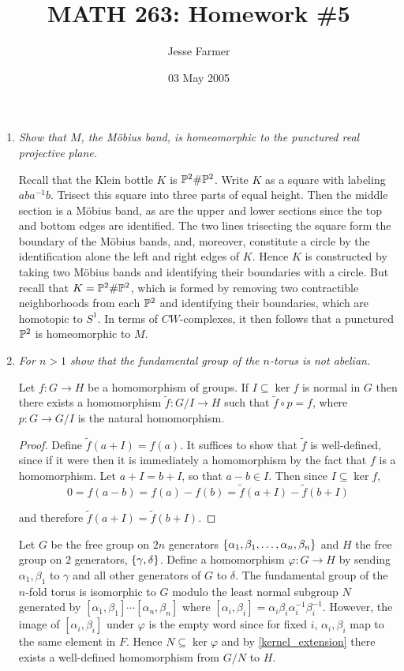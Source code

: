 \documentclass[10pt]{article}
\title{MATH 263: Homework \#5}
\author{Jesse Farmer}
\date{03 May 2005}
\begin{document}
\maketitle

\begin{enumerate}
\item \emph{Show that $M$, the M\"{o}bius band, is homeomorphic to the punctured real projective plane.}

Recall that the Klein bottle $K$ is $\P^2 \# \P^2$.  Write $K$ as a square with labeling $aba^{-1}b$.  Trisect this square into three parts of equal height.  Then the middle section is a M\"{o}bius band, as are the upper and lower sections since the top and bottom edges are identified.  The two lines trisecting the square form the boundary of the M\"{o}bius bands, and, moreover, constitute a circle by the identification alone the left and right edges of $K$.  Hence $K$ is constructed by taking two M\"{o}bius bands and identifying their boundaries with a circle.  But recall that $K = \P^2 \# \P^2$, which is formed by removing two contractible neighborhoods from each $\P^2$ and identifying their boundaries, which are homotopic to $S^1$.  In terms of $CW$-complexes, it then follows that a punctured $\P^2$ is homeomorphic to $M$.

\item \emph{For $n > 1$ show that the fundamental group of the $n$-torus is not abelian.}

\begin{lemma}
\label{kernel_extension}
Let $f: G \rightarrow H$ be a homomorphism of groups.  If $I \subseteq \ker f$ is normal in $G$ then there exists a homomorphism $\tilde{f}: G/I \rightarrow H$ such that $\tilde{f} \circ p = f$, where $p: G \rightarrow G/I$ is the natural homomorphism.
\end{lemma}
\begin{proof}
Define $\tilde{f}(a + I) = f(a)$.  It suffices to show that $\tilde{f}$ is well-defined, since if it were then it is immediately a homomorphism by the fact that $f$ is a homomorphism.  Let $a + I = b + I$, so that $a-b \in I$.  Then since $I \subseteq \ker f$,
\[
0 = f(a-b) = f(a) - f(b) = \tilde{f}(a+I) - \tilde{f}(b+I)
\]

and therefore $\tilde{f}(a+I) = \tilde{f}(b+I)$.
\end{proof}

Let $G$ be the free group on $2n$ generators $\set{\alpha_1, \beta_1, \ldots, \alpha_n, \beta_n}$ and $H$ the free group on $2$ generators, $\set{\gamma, \delta}$.  Define a homomorphism $\varphi: G \rightarrow H$ by sending $\alpha_1, \beta_1$ to $\gamma$ and all other generators of $G$ to $\delta$.  The fundamental group of the $n$-fold torus is isomorphic to $G$ modulo the least normal subgroup $N$ generated by $[\alpha_1, \beta_1] \cdots [\alpha_n, \beta_n]$ where $[\alpha_i, \beta_i] = \alpha_i\beta_i\alpha_i^{-1}\beta_i^{-1}$.  However, the image of $[\alpha_i, \beta_i]$ under $\varphi$ is the empty word since for fixed $i$, $\alpha_i, \beta_i$ map to the same element in $F$.  Hence $N \subseteq \ker \varphi$ and by \eqref{kernel_extension} there exists a well-defined homomorphism from $G/N$ to $H$.


\end{enumerate}
\end{document}
